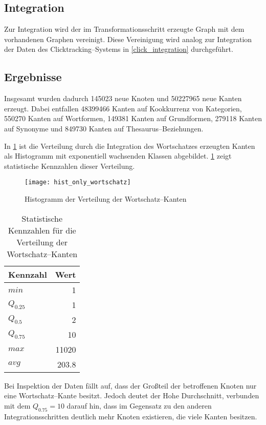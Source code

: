 \subsection{Integration}

Zur Integration wird der im Transformationsschritt erzeugte Graph mit dem vorhandenen Graphen vereinigt. Diese Vereinigung wird analog zur Integration der Daten des Clicktracking--Systems in \cref{click_integration} durchgeführt. 

\subsection{Ergebnisse}

Insgesamt wurden dadurch \num{145023} neue Knoten und \num{50227965} neue Kanten erzeugt.  Dabei entfallen \num{48399466} Kanten auf Kookkurrenz von Kategorien, \num{550270} Kanten auf Wortformen, \num{149381} Kanten auf Grundformen, \num{279118} Kanten auf Synonyme und \num{849730} Kanten auf Thesaurus--Beziehungen.

In \cref{fig:hist_only_wortschatz} ist die Verteilung durch die Integration des Wortschatzes erzeugten Kanten als Histogramm mit exponentiell wachsenden Klassen abgebildet. \cref{tab:only_wortschatz} zeigt statistische Kennzahlen dieser Verteilung.

\begin{figure}[h]
\centering
\texttt{[image: hist\_only\_wortschatz]}
\caption{Histogramm der Verteilung der Wortschatz--Kanten}
\label{fig:hist_only_wortschatz}
\end{figure}

\begin{table}[h]
\centering
\begin{tabular}{lr}
    \toprule
    Kennzahl & Wert \\
    \midrule
    \(min\) & \num{1} \\
    \(Q_{0.25}\) & \num{1} \\
    \(Q_{0.5}\) & \num{2} \\
    \(Q_{0.75}\) & \num{10} \\
    \(max\) &  \num{11020} \\
    \(avg\) &  \num{203,8} \\
    \bottomrule
\end{tabular}
\caption{Statistische Kennzahlen für die Verteilung der Wortschatz--Kanten}
\label{tab:only_wortschatz}
\end{table}

Bei Inspektion der Daten fällt auf, dass der Großteil der betroffenen Knoten nur eine Wortschatz--Kante besitzt. Jedoch deutet der Hohe Durchschnitt, verbunden mit dem \(Q_{0.75}=10\) darauf hin, dass im Gegensatz zu den anderen Integrationsschritten deutlich mehr Knoten existieren, die viele Kanten besitzen.

